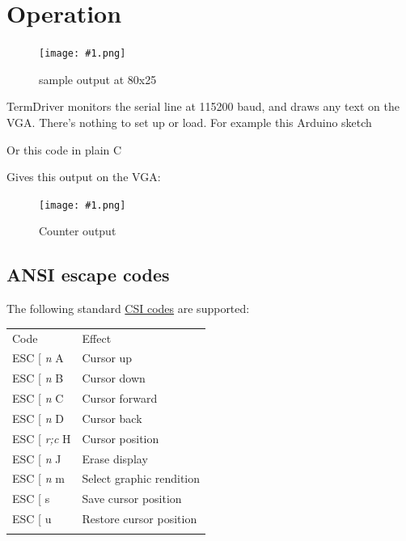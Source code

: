 \documentclass{article}
\newcommand{\heavyline}{\specialrule{1pt}{1pt}{1pt}}
\newcommand{\png}[2]{
\begin{figure}[H]
\begin{center}
\texttt{[image: \#1.png]}
\caption{#2}
\end{center}
\end{figure}
}
\newcommand{\gap}{\vspace{10pt}}
\begin{document}
\newcommand{\eg}[1]{
\begin{framed}

\end{framed}
}

\eg{termdriver-helloworld}

\section{Operation}

\png{img/page1}{sample output at 80x25}

TermDriver monitors the serial line at 115200 baud, and draws any
text on the VGA.
There's nothing to set up or load.
For example this Arduino sketch

\eg{termdriver-counter1}

\noindent
Or this code in plain C

\eg{termdriver-counter2}

\noindent
Gives this output on the VGA:

\png{img/page2}{Counter output}

\subsection{ANSI escape codes}

The following standard
\href{https://en.wikipedia.org/wiki/ANSI_escape_code\#CSI_sequences}{CSI
codes} are supported:

\gap\noindent
\begin{tabularx}{\linewidth}{lX}
\heavyline
Code & Effect \\ \heavyline

ESC {[} \emph{n} A & Cursor up \\

ESC {[} \emph{n} B & Cursor down \\

ESC {[} \emph{n} C & Cursor forward \\

ESC {[} \emph{n} D & Cursor back \\

ESC {[} \emph{r;c} H & Cursor position \\

ESC {[} \emph{n} J & Erase display \\

ESC {[} \emph{n} m & Select graphic rendition \\

ESC {[} s & Save cursor position \\

ESC {[} u & Restore cursor position \\ \heavyline
\end{tabularx}
\gap
\end{document}
